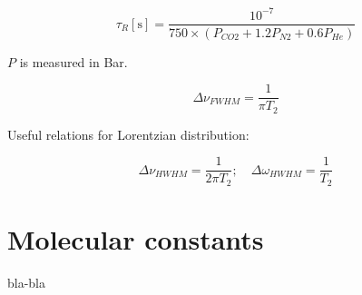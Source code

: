 \documentclass{report}
\begin{document}
\begin{equation}\label{eq:tauR}
\tau _R[\text{s}] = \frac{10^{-7}}{750 \times (P_{CO2}+1.2P_{N2}+0.6P_{He})}
\end{equation}

$P$ is measured in Bar.

\begin{equation*}
\Delta\nu _{FWHM} = \frac{1}{\pi T_2}
\end{equation*}

Useful relations for Lorentzian distribution:

\begin{equation*}
\Delta\nu _{HWHM} = \frac{1}{2\pi T_2};\quad \Delta\omega _{HWHM} = \frac{1}{T_2}
\end{equation*}


\section{Molecular constants}
bla-bla
\end{document}
